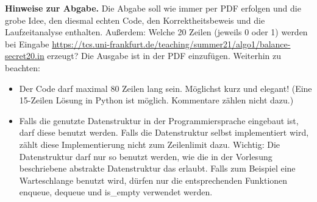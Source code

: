 \documentclass{uebung_cs}
\begin{document}
\begin{aufgabe}
  \textbf{Hinweise zur Abgabe.}
  Die Abgabe soll wie immer per PDF erfolgen und die grobe Idee, den diesmal echten Code, den Korrektheitsbeweis und die Laufzeitanalyse enthalten.
  Außerdem: Welche 20 Zeilen (jeweils 0 oder 1) werden bei Eingabe \url{https://tcs.uni-frankfurt.de/teaching/summer21/algo1/balance-secret20.in} erzeugt? Die Ausgabe ist in der PDF einzufügen.
  Weiterhin zu beachten:
  \begin{itemize}
  \item Der Code darf maximal 80 Zeilen lang sein. Möglichst kurz und elegant! (Eine 15-Zeilen Lösung in Python ist möglich. Kommentare zählen nicht dazu.)
  \item Falls die genutzte Datenstruktur in der Programmiersprache eingebaut ist, darf diese benutzt werden. Falls die Datenstruktur selbst implementiert wird, zählt diese Implementierung nicht zum Zeilenlimit dazu. Wichtig: Die Datenstruktur darf nur so benutzt werden, wie die in der Vorlesung beschriebene abstrakte Datenstruktur das erlaubt. Falls zum Beispiel eine Warteschlange benutzt wird, dürfen nur die entsprechenden Funktionen enqueue, dequeue und is\_empty verwendet werden.
  \end{itemize}

\end{aufgabe}
\end{document}
